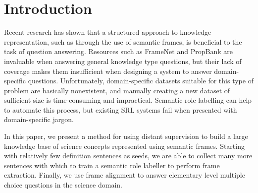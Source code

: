 \section{Introduction}

Recent research has shown that a structured approach to knowledge representation, such as through the use of semantic frames, is beneficial to the task of question answering. Resources such as FrameNet and PropBank are invaluable when answering general knowledge type questions, but their lack of coverage makes them insufficient when designing a system to answer domain-specific questions. Unfortunately, domain-specific datasets suitable for this type of problem are basically nonexistent, and manually creating a new dataset of sufficient size is time-consuming and impractical. Semantic role labelling can help to automate this process, but existing SRL systems fail when presented with domain-specific jargon.

In this paper, we present a method for using distant supervision to build a large knowledge base of science concepts represented using semantic frames. Starting with relatively few definition sentences as seeds, we are able to collect many more sentences with which to train a semantic role labeller to perform frame extraction. Finally, we use frame alignment to answer elementary level multiple choice questions in the science domain.

